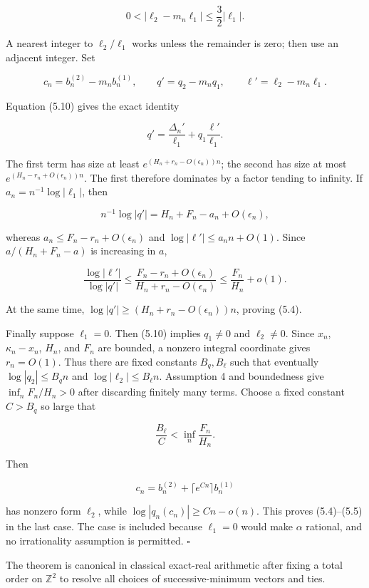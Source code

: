 \documentclass[
  11pt,
]{article}
\begin{document}
\[
 0<|\ell_2-m_n\ell_1|\le\frac32|\ell_1|.             \tag{5.13}
\]

A nearest integer to \(\ell_2/\ell_1\) works unless the remainder is
zero; then use an adjacent integer. Set

\[
 c_n=b_n^{(2)}-m_nb_n^{(1)},\qquad
 q'=q_2-m_nq_1,\qquad \ell'=\ell_2-m_n\ell_1.
\]

Equation (5.10) gives the exact identity

\[
 q'=\frac{\Delta_n'}{\ell_1}
     +q_1\frac{\ell'}{\ell_1}.                       \tag{5.14}
\]

The first term has size at least \(e^{(H_n+r_n-O(\epsilon_n))n}\); the
second has size at most \(e^{(H_n-r_n+O(\epsilon_n))n}\). The first
therefore dominates by a factor tending to infinity. If
\(a_n=n^{-1}\log|\ell_1|\), then

\[
 n^{-1}\log|q'|=H_n+F_n-a_n+O(\epsilon_n),
\]

whereas \(a_n\le F_n-r_n+O(\epsilon_n)\) and
\(\log|\ell'|\le a_nn+O(1)\). Since \(a/(H_n+F_n-a)\) is increasing in
\(a\),

\[
 \frac{\log|\ell'|}{\log|q'|}
 \le\frac{F_n-r_n+O(\epsilon_n)}
          {H_n+r_n-O(\epsilon_n)}
 \le\frac{F_n}{H_n}+o(1).                           \tag{5.15}
\]

At the same time, \(\log|q'|\ge(H_n+r_n-O(\epsilon_n))n\), proving
(5.4).

Finally suppose \(\ell_1=0\). Then (5.10) implies \(q_1\ne0\) and
\(\ell_2\ne0\). Since \(x_n\), \(\kappa_n-x_n\), \(H_n\), and \(F_n\)
are bounded, a nonzero integral coordinate gives \(r_n=O(1)\). Thus
there are fixed constants \(B_q,B_\ell\) such that eventually
\(\log|q_2|\le B_qn\) and \(\log|\ell_2|\le B_\ell n\). Assumption 4 and
boundedness give \(\inf_nF_n/H_n>0\) after discarding finitely many
terms. Choose a fixed constant \(C>B_q\) so large that

\[
 \frac{B_\ell}{C}<\inf_n\frac{F_n}{H_n}.
\]

Then

\[
 c_n=b_n^{(2)}+\lceil e^{Cn}\rceil b_n^{(1)}
\]

has nonzero form \(\ell_2\), while \(\log|q_n(c_n)|\ge Cn-o(n)\). This
proves (5.4)--(5.5) in the last case. The case is included because
\(\ell_1=0\) would make \(\alpha\) rational, and no irrationality
assumption is permitted. \(\square\)

The theorem is canonical in classical exact-real arithmetic after fixing
a total order on \(\mathbb Z^2\) to resolve all choices of
successive-minimum vectors and ties.
\end{document}
